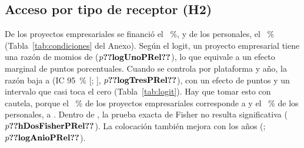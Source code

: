 
\subsection{Acceso por tipo de receptor (H2)}

De los  proyectos empresariales se financió el ~\%, y de los  personales, el ~\% (Tabla~\ref{tab:condiciones} del Anexo). Según el logit, un proyecto empresarial tiene una razón de momios de  ($p\cifra{logUnoPRel}$), lo que equivale a un efecto marginal de  puntos porcentuales. Cuando se controla por plataforma y año, la razón baja a  (IC 95~\% [; ], $p\cifra{logTresPRel}$), con un efecto de  puntos y un intervalo que casi toca el cero (Tabla~\ref{tab:logit}). Hay que tomar esto con cautela, porque el ~\% de los proyectos empresariales corresponde a  y el ~\% de los personales, a . Dentro de , la prueba exacta de Fisher no resulta significativa ($p\cifra{hDosFisherPRel}$). La colocación también mejora con los años (; $p\cifra{logAnioPRel}$).

\begin{table}[!t]
\caption{Logit de la probabilidad de colocación de los proyectos publicados}
\label{tab:logit}
\small

\end{table}

